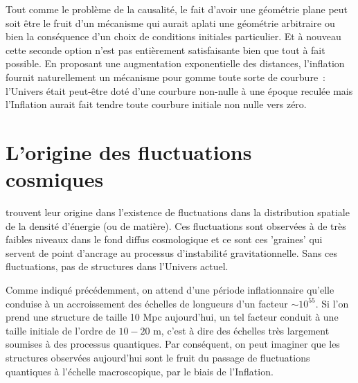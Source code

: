 Tout comme le problème de la causalité, le fait d'avoir une géométrie plane peut soit être le fruit d'un mécanisme qui aurait aplati une géométrie arbitraire ou bien la conséquence d'un choix de conditions initiales particulier. Et à nouveau cette seconde option n'est pas entièrement satisfaisante bien que tout à fait possible. En proposant une augmentation exponentielle des distances, l'inflation fournit naturellement un mécanisme pour gomme toute sorte de courbure~: l'Univers était peut-être doté d'une courbure non-nulle à une époque reculée mais l'Inflation aurait fait tendre toute courbure initiale non nulle vers zéro.

\section{L'origine des fluctuations cosmiques}
 trouvent leur origine dans l'existence de fluctuations dans la distribution spatiale de la densité d'énergie (ou de matière). Ces fluctuations sont observées à de très faibles niveaux dans le fond diffus cosmologique et ce sont ces 'graines' qui servent de point d'ancrage au processus d'instabilité gravitationnelle. Sans ces fluctuations, pas de structures dans l'Univers actuel. 

Comme indiqué précédemment, on attend d'une période inflationnaire qu'elle conduise à un accroissement des échelles de longueurs d'un facteur $\sim 10^{55}$. Si l'on prend une structure de taille 10 Mpc aujourd'hui, un tel facteur conduit à  une taille initiale de l'ordre de $10-{20}$ m, c'est à dire des échelles très largement soumises à des processus quantiques. Par conséquent, on peut imaginer que les structures observées aujourd'hui sont le fruit du passage de fluctuations quantiques à l'échelle macroscopique, par le biais de l'Inflation.